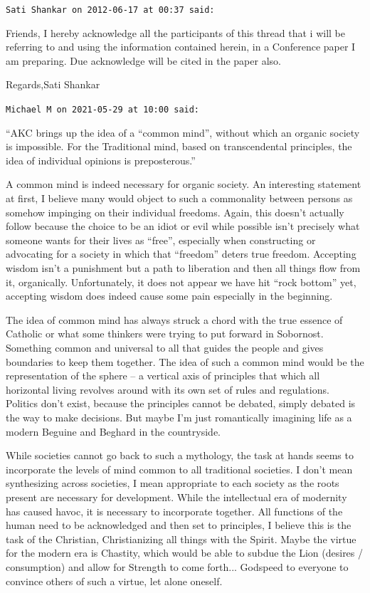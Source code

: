 \begin{footnotesize}
\begin{sffamily}
\hfill

\texttt{Sati Shankar on 2012-06-17 at 00:37 said:}

Friends, I hereby acknowledge all the participants of this thread that i will be referring to and using the information contained herein, in a Conference paper I am preparing. Due acknowledge will be cited in the paper also.

Regards,Sati Shankar

\hfill

\texttt{Michael M on 2021-05-29 at 10:00 said:}

``AKC brings up the idea of a ``common mind'', without which an organic society is impossible. For the Traditional mind, based on transcendental principles, the idea of individual opinions is preposterous.''

A common mind is indeed necessary for organic society. An interesting statement at first, I believe many would object to such a commonality between persons as somehow impinging on their individual freedoms. Again, this doesn't actually follow because the choice to be an idiot or evil while possible isn't precisely what someone wants for their lives as ``free'', especially when constructing or advocating for a society in which that ``freedom'' deters true freedom. Accepting wisdom isn't a punishment but a path to liberation and then all things flow from it, organically. Unfortunately, it does not appear we have hit ``rock bottom'' yet, accepting wisdom does indeed cause some pain especially in the beginning.

The idea of common mind has always struck a chord with the true essence of Catholic or what some thinkers were trying to put forward in Sobornost. Something common and universal to all that guides the people and gives boundaries to keep them together. The idea of such a common mind would be the representation of the sphere -- a vertical axis of principles that which all horizontal living revolves around with its own set of rules and regulations. Politics don't exist, because the principles cannot be debated, simply debated is the way to make decisions. But maybe I'm just romantically imagining life as a modern Beguine and Beghard in the countryside.

While societies cannot go back to such a mythology, the task at hands seems to incorporate the levels of mind common to all traditional societies. I don't mean synthesizing across societies, I mean appropriate to each society as the roots present are necessary for development. While the intellectual era of modernity has caused havoc, it is necessary to incorporate together. All functions of the human need to be acknowledged and then set to principles, I believe this is the task of the Christian, Christianizing all things with the Spirit. Maybe the virtue for the modern era is Chastity, which would be able to subdue the Lion (desires / consumption) and allow for Strength to come forth... Godspeed to everyone to convince others of such a virtue, let alone oneself.


\hfill

\end{sffamily}
\end{footnotesize}

